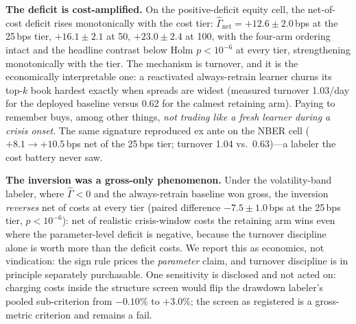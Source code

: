 \documentclass[sigconf,anonymous]{acmart}
\newcommand{\G}{\hat\Gamma}
\begin{document}
\textbf{The deficit is cost-amplified.} On the positive-deficit equity
cell, the net-of-cost deficit rises monotonically with the cost tier:
$\G_{\mathrm{net}} = +12.6 \pm 2.0$\,bps at the 25\,bps tier,
$+16.1 \pm 2.1$ at 50, $+23.0 \pm 2.4$ at 100, with the
four-arm ordering intact and the headline contrast below Holm
$p<10^{-6}$ at every tier, strengthening monotonically with the tier. The mechanism is turnover, and it is the
economically interpretable one: a reactivated always-retrain learner
churns its top-$k$ book hardest exactly when spreads are widest
(measured turnover 1.03/day for the deployed baseline versus 0.62 for
the calmest retaining arm). Paying to remember buys, among other
things, \emph{not trading like a fresh learner during a crisis onset}.
The same signature reproduced ex ante on the NBER cell
($+8.1 \to +10.5$\,bps net of the 25\,bps tier; turnover 1.04 vs.\
0.63)---a labeler the cost battery never saw.

\textbf{The inversion was a gross-only phenomenon.} Under the
volatility-band labeler, where $\G < 0$ and the always-retrain baseline
won gross, the inversion \emph{reverses} net of costs at every tier
(paired difference $-7.5 \pm 1.0$\,bps at the 25\,bps tier,
$p<10^{-6}$): net of realistic crisis-window costs the
retaining arm wins even where the parameter-level deficit is negative,
because the turnover discipline alone is worth more than the deficit
costs. We report this as economics, not vindication: the sign rule
prices the \emph{parameter} claim, and turnover discipline is in
principle separately purchasable. One sensitivity is
disclosed and not acted on: charging costs inside the structure screen
would flip the drawdown labeler's pooled sub-criterion from
$-0.10\%$ to $+3.0\%$; the screen as registered is a gross-metric
criterion and remains a fail.
\end{document}
